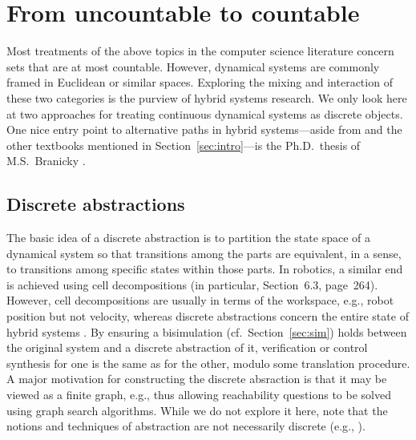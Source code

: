 \documentclass{amsart}
\DeclareMathOperator{\Act}{Act}
\DeclareMathOperator{\ap}{AP}
\theoremstyle{plain}
\theoremstyle{definition}
\theoremstyle{definition}
\begin{document}





\section{From uncountable to countable}\label{sec:conttodiscr}

Most treatments of the above topics in the computer science literature concern
sets that are at most countable.  However, dynamical systems are commonly framed
in Euclidean or similar spaces.  Exploring the mixing and interaction of these
two categories is the purview of hybrid systems research.  We only look here at
two approaches for treating continuous dynamical systems as discrete objects.
One nice entry point to alternative paths in hybrid systems---aside from
\cite{Tabuada2009} and the other textbooks mentioned in
Section~\ref{sec:intro}---is the Ph.D.\ thesis of M.S.~Branicky \cite{Branicky1995b}.

\subsection{Discrete abstractions}

The basic idea of a discrete abstraction is to partition the state space of a
dynamical system so that transitions among the parts are equivalent, in a sense,
to transitions among specific states within those parts.  In robotics, a similar
end is achieved using cell decompositions \cite{LaValle2006} (in particular,
Section~6.3, page~264).  However, cell decompositions are usually in terms of
the workspace, e.g., robot position but not velocity, whereas discrete
abstractions concern the entire state of hybrid systems \cite{AlurHLP2000}.  By
ensuring a bisimulation (cf.\ Section~\ref{sec:sim}) holds between the original
system and a discrete abstraction of it, verification or control synthesis for
one is the same as for the other, modulo some translation procedure.  A major
motivation for constructing the discrete absraction is that it may be viewed as
a finite graph, e.g., thus allowing reachability questions to be solved using
graph search algorithms.  While we do not explore it here, note that the notions
and techniques of abstraction are not necessarily discrete (e.g.,
\cite{PappasLS2000}).
\end{document}
